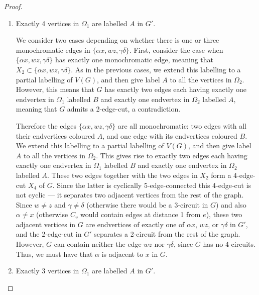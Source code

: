 \documentclass[]{theclass}
\begin{document}
\begin{proof}
\begin{enumerate}[label=(B\arabic*), start=0]
\item Exactly 4 vertices in $\Omega_{1}$ are labelled $A$ in $G'$.

We consider two cases depending on whether there is one or three monochromatic edges in $\{\alpha x, wz,\gamma\delta\}$. First, consider the case when $\{\alpha x, wz,\gamma\delta\}$ has exactly one monochromatic edge, meaning that $X_2\subset\{\alpha x, wz,\gamma\delta\}$. As in the previous cases, we extend this labelling to a partial labelling of $V(G)$, and then give label $A$ to all the vertices in $\Omega_{2}$. However, this means that $G$ has exactly two edges each having exactly one endvertex in $\Omega_{1}$ labelled $B$ and exactly one endvertex in $\Omega_{2}$ labelled $A$, meaning that $G$ admits a 2-edge-cut, a contradiction. 

Therefore the edges $\{\alpha x, wz,\gamma\delta\}$ are all monochromatic: two edges with all their endvertices coloured $A$, and one edge with its endvertices coloured $B$. We extend this labelling to a partial labelling of $V(G)$, and then give label $A$ to all the vertices in $\Omega_{2}$. This gives rise to exactly two edges each having exactly one endvertex in $\Omega_{1}$ labelled $B$ and exactly one endvertex in $\Omega_{2}$ labelled $A$. These two edges together with the two edges in $X_2$ form a 4-edge-cut $X_4$ of $G$. Since the latter is cyclically 5-edge-connected this 4-edge-cut is not cyclic --- it separates two adjacent vertices from the rest of the graph. Since $w\ne z$ and $\gamma\ne \delta$ (otherwise there would be a 3-circuit in $G$) and also $\alpha \ne x$ (otherwise $C_v$ would contain edges at distance 1 from $e$), these two adjacent vertices in $G$ are endvertices of exactly one of $\alpha x$, $wz$, or $\gamma\delta$ in $G'$, and the 2-edge-cut in $G'$ separates a 2-circuit from the rest of the graph. However, $G$ can contain neither the edge $wz$ nor $\gamma\delta$, since $G$ has no 4-circuits. Thus, we must have that $\alpha$ is adjacent to $x$ in $G$. 

\item Exactly 3 vertices in $\Omega_{1}$ are labelled $A$ in $G'$.


\end{enumerate}
\end{proof}
\end{document}
